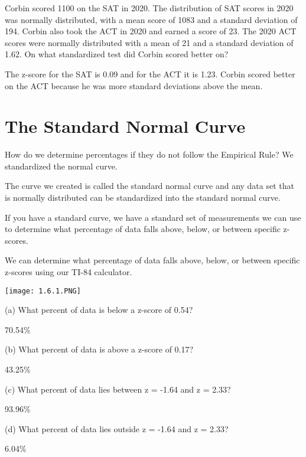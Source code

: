 \documentclass[../stats.tex]{subfiles}
\begin{document}
\begin{example}
    Corbin scored 1100 on the SAT in 2020. The distribution of SAT scores in 2020 was normally distributed, 
    with a mean score of 1083 and a standard deviation of 194. Corbin also took the ACT in 2020 and earned a score of 23. The 2020 ACT scores were normally distributed with 
    a mean of 21 and a standard deviation of 1.62. On what standardized test did Corbin scored better on?

    The z-score for the SAT is 0.09 and for the ACT it is 1.23. Corbin scored better on the ACT because he was more standard deviations above the mean.
\end{example}


\section{The Standard Normal Curve}
How do we determine percentages if they do not follow the Empirical Rule? We standardized the normal curve.

The curve we created is called the standard normal curve and any data set that is normally distributed can be standardized into the standard normal curve.

If you have a standard curve, we have a standard set of measurements we can use to determine what percentage of data falls above, below, or between specific z-scores.

We can determine what percentage of data falls above, below, or between specific z-scores using our TI-84 calculator.
\begin{center}
    \texttt{[image: 1.6.1.PNG]}
\end{center}

\begin{example}
    (a) What percent of data is below a z-score of 0.54?

    70.54\%

    (b) What percent of data is above a z-score of 0.17?

    43.25\%

    (c) What percent of data lies between z = -1.64 and z = 2.33?

    93.96\%

    (d) What percent of data lies outside z = -1.64 and z = 2.33?

    6.04\%
\end{example}
\end{document}
